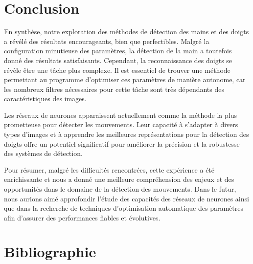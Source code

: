 \documentclass[11pt]{article}
\begin{document}
\newpage

\section*{Conclusion}
En synthèse, notre exploration des méthodes de détection des mains et des doigts a révélé des résultats encourageants, bien que perfectibles. Malgré la configuration minutieuse des paramètres, la détection de la main a toutefois donné des résultats satisfaisants. Cependant, la reconnaissance des doigts se révèle être une tâche plus complexe. Il est essentiel de trouver une méthode permettant au programme d'optimiser ces paramètres de manière autonome, car les nombreux filtres nécessaires pour cette tâche sont très dépendants des caractéristiques des images. \bigbreak

Les réseaux de neurones apparaissent actuellement comme la méthode la plus prometteuse pour détecter les mouvements. Leur capacité à s'adapter à divers types d'images et à apprendre les meilleures représentations pour la détection des doigts offre un potentiel significatif pour améliorer la précision et la robustesse des systèmes de détection. \bigbreak

Pour résumer, malgré les difficultés rencontrées, cette expérience a été enrichissante et nous a donné une meilleure compréhension des enjeux et des opportunités dans le domaine de la détection des mouvements. Dans le futur, nous aurions aimé approfondir l'étude des capacités des réseaux de neurones ainsi que dans la recherche de techniques d'optimisation automatique des paramètres afin d'assurer des performances fiables et évolutives. \bigbreak

\newpage

\section*{Bibliographie}
\printbibliography

\newpage




\newpage
\
\newpage
\end{document}
